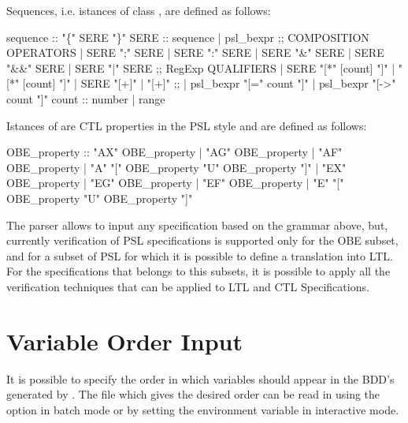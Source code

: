 %
Sequences, i.e. istances of class , are defined as follows:
%
\begin{Grammar}
sequence ::
   "\{" SERE "\}"
SERE ::
   sequence
 | psl_bexpr
 ;; COMPOSITION OPERATORS
 | SERE ";" SERE
 | SERE ":" SERE
 | SERE "&" SERE
 | SERE "&&" SERE
 | SERE "|" SERE
 ;; RegExp QUALIFIERS
 | SERE "[*" [count] "]"
 | "[*" [count] "]"
 | SERE "[+]"
 | "[+]"
 ;;
 | psl_bexpr "[=" count "]"
 | psl_bexpr "[->" count "]"
count ::
   number
 | range
\end{Grammar}
%
Istances of  are CTL properties in the PSL style
and are defined as follows:
%
\begin{Grammar}
OBE_property ::
  "AX" OBE_property
 | "AG" OBE_property
 | "AF" OBE_property
 | "A" "[" OBE_property "U" OBE_property "]"
 | "EX" OBE_property
 | "EG" OBE_property
 | "EF" OBE_property
 | "E" "[" OBE_property "U" OBE_property "]"
\end{Grammar}
%
The \nusmv parser allows to input any specification based on the
grammar above, but, currently verification of PSL specifications is
supported only for the OBE subset, and for a subset of PSL for
which it is possible to define a translation into LTL. For the
specifications that belongs to this subsets, it is possible to apply
all the verification techniques that can be applied to LTL and CTL
Specifications.


\section{Variable Order Input}
%
It is possible to specify the order in which variables should appear
in the BDD's generated by \nusmv. The file which gives the desired
order can be read in using the  option in batch mode or
by setting the  environment variable in
interactive mode.

